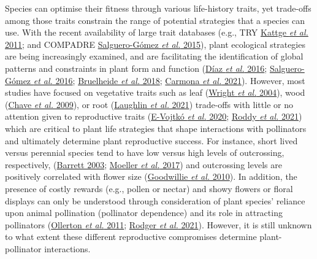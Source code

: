 \documentclass[
  12pt,
  a4paper,
]{article}
\begin{document}
Species can optimise their fitness through various life-history traits, yet trade-offs among those traits constrain the range of potential strategies that a species can use. With the recent availability of large trait databases (e.g., TRY \protect\hyperlink{ref-kattge2011}{Kattge \emph{et al.} 2011}; and COMPADRE \protect\hyperlink{ref-salguero2015}{Salguero-Gómez \emph{et al.} 2015}), plant ecological strategies are being increasingly examined, and are facilitating the identification of global patterns and constraints in plant form and function (\protect\hyperlink{ref-diaz2016}{Díaz \emph{et al.} 2016}; \protect\hyperlink{ref-salguero2016}{Salguero-Gómez \emph{et al.} 2016}; \protect\hyperlink{ref-bruelheide2018}{Bruelheide \emph{et al.} 2018}; \protect\hyperlink{ref-carmona2021}{Carmona \emph{et al.} 2021}). However, most studies have focused on vegetative traits such as leaf (\protect\hyperlink{ref-wright2004}{Wright \emph{et al.} 2004}), wood (\protect\hyperlink{ref-chave2009}{Chave \emph{et al.} 2009}), or root (\protect\hyperlink{ref-laughlin2021}{Laughlin \emph{et al.} 2021}) trade-offs with little or no attention given to reproductive traits (\protect\hyperlink{ref-evojtko2020}{E-Vojtkó \emph{et al.} 2020}; \protect\hyperlink{ref-roddy2021}{Roddy \emph{et al.} 2021}) which are critical to plant life strategies that shape interactions with pollinators and ultimately determine plant reproductive success. For instance, short lived versus perennial species tend to have low versus high levels of outcrossing, respectively, (\protect\hyperlink{ref-barrett2003}{Barrett 2003}; \protect\hyperlink{ref-moeller2017}{Moeller \emph{et al.} 2017}) and outcrossing levels are positively correlated with flower size (\protect\hyperlink{ref-goodwillie2010}{Goodwillie \emph{et al.} 2010}). In addition, the presence of costly rewards (e.g., pollen or nectar) and showy flowers or floral displays can only be understood through consideration of plant species' reliance upon animal pollination (pollinator dependence) and its role in attracting pollinators (\protect\hyperlink{ref-ollerton2011}{Ollerton \emph{et al.} 2011}; \protect\hyperlink{ref-rodger2021}{Rodger \emph{et al.} 2021}). However, it is still unknown to what extent these different reproductive compromises determine plant-pollinator interactions.
\end{document}
